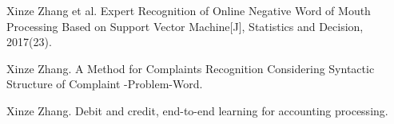 
\begin{cventries}
\vspace{-1.5mm}
\cvpapers
{
    \begin{cvitems}
        \item {Xinze Zhang et al. Expert Recognition of Online Negative Word of Mouth Processing Based on Support Vector Machine[J], Statistics and Decision, 2017(23).}
        \item {Xinze Zhang. A Method for Complaints Recognition Considering Syntactic Structure of Complaint -Problem-Word.}
        \item {Xinze Zhang. Debit and credit, end-to-end learning for accounting processing.}
    \end{cvitems}
}

\end{cventries}